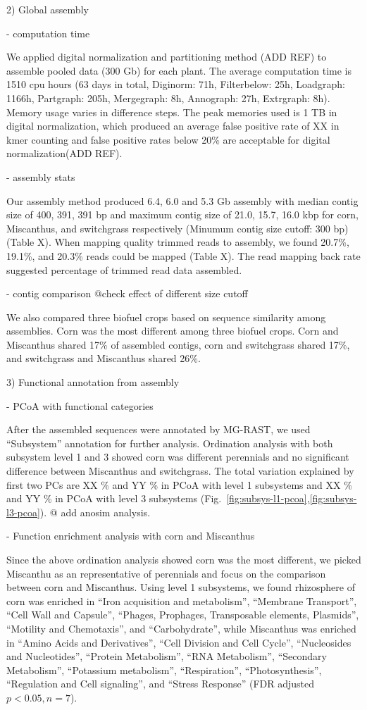 \documentclass[12pt]{article}
\begin{document}
2) Global assembly

- computation time

We applied digital normalization and partitioning method (ADD REF) to assemble pooled data (300 Gb) for each plant. The average computation time is 1510 cpu hours (63 days in total, Diginorm: 71h, Filterbelow: 25h, Loadgraph: 1166h, Partgraph: 205h, Mergegraph: 8h, Annograph: 27h, Extrgraph: 8h). Memory usage varies in difference steps. The peak memories used is 1 TB in digital normalization, which produced an average false positive rate of XX in kmer counting and false positive rates below 20\% are acceptable for digital normalization(ADD REF). 

- assembly stats

Our assembly method produced  6.4, 6.0 and 5.3 Gb assembly with median contig size of 400, 391, 391 bp and maximum contig size of 21.0, 15.7, 16.0 kbp for corn, Miscanthus, and switchgrass respectively (Minumum contig size cutoff: 300 bp)(Table X). When mapping quality trimmed reads to assembly, we found 20.7\%, 19.1\%, and 20.3\% reads could be mapped (Table X). The read mapping back rate suggested percentage of trimmed read data assembled.

- contig comparison @check effect of different size cutoff

We also compared three biofuel crops based on sequence similarity among assemblies. Corn was the most different among three biofuel crops. Corn and Miscanthus shared 17\% of assembled contigs, corn and switchgrass shared 17\%, and switchgrass and Miscanthus shared 26\%.

3) Functional annotation from assembly

- PCoA with functional categories

After the assembled sequences were annotated by MG-RAST, we used ``Subsystem'' annotation for further analysis. Ordination analysis with both subsystem level 1 and 3 showed corn was different perennials and no significant difference between Miscanthus and switchgrass. The total variation explained by first two PCs are XX \% and YY \% in PCoA with level 1 subsystems and XX \% and YY \% in PCoA with level 3 subsystems (Fig.~\ref{fig:subsys-l1-pcoa},\ref{fig:subsys-l3-pcoa}). @ add anosim analysis.

- Function enrichment analysis with corn and Miscanthus

Since the above ordination analysis showed corn was the most different, we picked Miscanthu as an representative of perennials and focus on the comparison between corn and Miscanthus. Using level 1 subsystems, we found rhizosphere of corn was enriched in ``Iron acquisition and metabolism'', ``Membrane Transport'', ``Cell Wall and Capsule'', ``Phages, Prophages, Transposable elements, Plasmids'', ``Motility and Chemotaxis'', and ``Carbohydrate'', while Miscanthus was enriched in ``Amino Acids and Derivatives'', ``Cell Division and Cell Cycle'', ``Nucleosides and Nucleotides'', ``Protein Metabolism'', ``RNA Metabolism'', ``Secondary Metabolism'', ``Potassium metabolism'', ``Respiration'', ``Photosynthesis'', ``Regulation and Cell signaling'', and ``Stress Response'' (FDR adjusted $p < 0.05, n = 7$).
\end{document}
